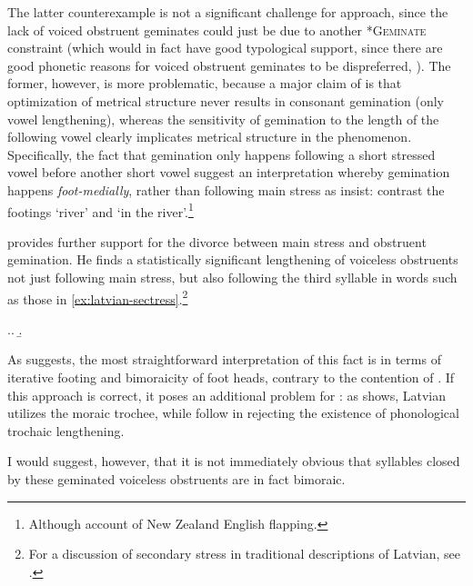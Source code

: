 The latter counterexample is not a significant challenge for  approach, since the lack of voiced obstruent geminates could just be due to another *\textsc{Geminate} constraint (which would in fact have good typological support, since there are good phonetic reasons for voiced obstruent geminates to be dispreferred, \eg \citealt{kirchnergem,hirose07,ohala:_turbul}). The former, however, is more problematic, because a major claim of \citet{bye08} is that optimization of metrical structure never results in consonant gemination (only vowel lengthening), whereas the sensitivity of gemination to the length of the following vowel clearly implicates metrical structure in the phenomenon. Specifically, the fact that gemination only happens following a short stressed vowel before another short vowel suggest an interpretation whereby gemination happens \emph{foot\hyp medially}, rather than following main stress as \citet{bye08} insist: contrast the footings  `river' and  `in the river'.\footnote{Although \cf {} account of New Zealand English flapping.}

\citet{karins96:_latvian} provides further support for the divorce between main stress and obstruent gemination. He finds a statistically significant lengthening of voiceless obstruents not just following main stress, but also following the third syllable in words such as those in \cref{ex:latvian-sectress}.\footnote{For a discussion of secondary stress in traditional descriptions of Latvian, see \citet{daugavet05:_palig}.}

\ex.\label{ex:latvian-sectress}\a.
\b.

As \citet{karins96:_latvian} suggests, the most straightforward interpretation of this fact is in terms of iterative footing and bimoraicity of foot heads, contrary to the contention of \citet{bye08}. If this approach is correct, it poses an additional problem for \citet{bye08}: as \citet{karins96:_latvian} shows, Latvian utilizes the moraic trochee, while \citet{bye08} follow \citet{hayes1995} in rejecting the existence of phonological trochaic lengthening.

I would suggest, however, that it is not immediately obvious that syllables closed by these geminated voiceless obstruents are in fact bimoraic.

